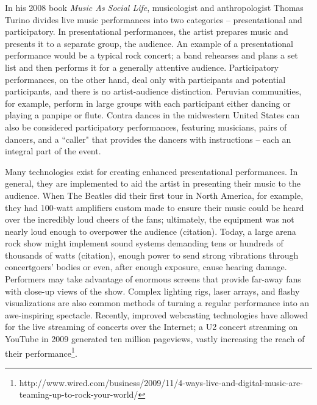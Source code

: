 In his 2008 book \textit{Music As Social Life}, musicologist and anthropologist Thomas Turino divides live music performances into two categories -- presentational and participatory. In presentational performances, the artist prepares music and presents it to a separate group, the audience. An example of a presentational performance would be a typical rock concert; a band rehearses and plans a set list and then performs it for a generally attentive audience. Participatory performances, on the other hand, deal only with participants and potential participants, and there is no artist-audience distinction. Peruvian communities, for example, perform in large groups with each participant either dancing or playing a panpipe or flute. Contra dances in the midwestern United States can also be considered participatory performances, featuring musicians, pairs of dancers, and a ``caller" that provides the dancers with instructions -- each an integral part of the event.

Many technologies exist for creating enhanced presentational performances. In general, they are implemented to aid the artist in presenting their music to the audience. When The Beatles did their first tour in North America, for example, they had 100-watt amplifiers custom made to ensure their music could be heard over the incredibly loud cheers of the fans; ultimately, the equipment was not nearly loud enough to overpower the audience (citation). Today, a large arena rock show might implement sound systems demanding tens or hundreds of thousands of watts (citation), enough power to send strong vibrations through concertgoers' bodies or even, after enough exposure, cause hearing damage. Performers may take advantage of enormous screens that provide far-away fans with close-up views of the show. Complex lighting rigs, laser arrays, and flashy visualizations are also common methods of turning a regular performance into an awe-inspiring spectacle. Recently, improved webcasting technologies have allowed for the live streaming of concerts over the Internet; a U2 concert streaming on YouTube in 2009 generated ten million pageviews, vastly increasing the reach of their performance\footnote{http://www.wired.com/business/2009/11/4-ways-live-and-digital-music-are-teaming-up-to-rock-your-world/}.

